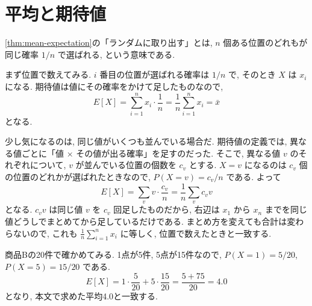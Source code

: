 \appendix
\section{平均と期待値}

    \cref{thm:mean-expectation}の「ランダムに取り出す」とは, $n$ 個ある位置のどれもが同じ確率 $1/n$ で選ばれる, という意味である.

    まず位置で数えてみる.
    $i$ 番目の位置が選ばれる確率は $1/n$ で, そのとき $X$ は $x_i$ になる.
    期待値は値にその確率をかけて足したものなので,
    \[
      E[X] = \sum_{i=1}^{n} x_i \cdot \frac{1}{n} = \frac{1}{n}\sum_{i=1}^{n} x_i = \bar{x}
    \]
    となる.

    少し気になるのは, 同じ値がいくつも並んでいる場合だ.
    期待値の定義では, 異なる値ごとに「値 × その値が出る確率」を足すのだった.
    そこで, 異なる値 $v$ のそれぞれについて, $v$ が並んでいる位置の個数を $c_v$ とする.
    $X = v$ になるのは $c_v$ 個の位置のどれかが選ばれたときなので, $P(X = v) = c_v/n$ である.
    よって
    \[
      E[X] = \sum_{v} v \cdot \frac{c_v}{n} = \frac{1}{n}\sum_{v} c_v v
    \]
    となる.
    $c_v v$ は同じ値 $v$ を $c_v$ 回足したものだから, 右辺は $x_1$ から $x_n$ までを同じ値どうしでまとめてから足しているだけである.
    まとめ方を変えても合計は変わらないので, これも $\frac{1}{n}\sum_{i=1}^{n} x_i$ に等しく, 位置で数えたときと一致する.

    商品Bの20件で確かめてみる.
    1点が5件, 5点が15件なので, $P(X=1) = 5/20$, $P(X=5) = 15/20$ である.
    \[
      E[X] = 1 \cdot \frac{5}{20} + 5 \cdot \frac{15}{20} = \frac{5 + 75}{20} = 4.0
    \]
    となり, 本文で求めた平均4.0と一致する.
